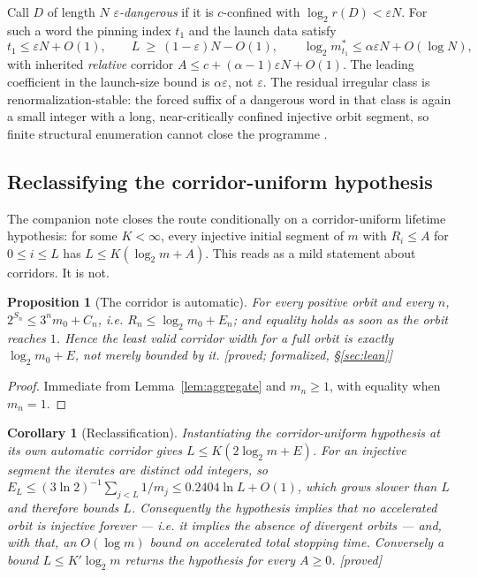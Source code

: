 \documentclass[11pt]{article}
\theoremstyle{plain}
\newtheorem{proposition}[theorem]{Proposition}
\newtheorem{corollary}[theorem]{Corollary}
\theoremstyle{definition}
\theoremstyle{remark}
\newcommand{\al}{\alpha}
\newcommand{\status}[1]{\textsf{\footnotesize[#1]}}
\begin{document}
Call $D$ of length $N$ \emph{$\varepsilon$-dangerous} if it is $c$-confined with
$\log_2 r(D)<\varepsilon N$. For such a word the pinning index $t_1$ and the launch data satisfy
\[
t_1\le\varepsilon N+O(1),\qquad
L\ \ge\ (1-\varepsilon)N-O(1),\qquad
\log_2 m^*_{t_1}\le \al\varepsilon N+O(\log N),
\]
with inherited \emph{relative} corridor $A\le c+(\al-1)\varepsilon N+O(1)$. The leading coefficient
in the launch-size bound is $\al\varepsilon$, not $\varepsilon$. The residual irregular class is
renormalization-stable: the forced suffix of a dangerous word in that class is again a small
integer with a long, near-critically confined injective orbit segment, so finite structural
enumeration cannot close the programme \cite{DJlaunch}.

\subsection{Reclassifying the corridor-uniform hypothesis}\label{sec:Uall}

The companion note closes the route conditionally on a corridor-uniform lifetime hypothesis: for
some $K<\infty$, every injective initial segment of $m$ with $R_i\le A$ for $0\le i\le L$ has
$L\le K(\log_2 m+A)$. This reads as a mild statement about corridors. It is not.

\begin{proposition}[The corridor is automatic]\label{prop:corridorauto}
For every positive orbit and every $n$, $2^{S_n}\le3^nm_0+C_n$, i.e.
$R_n\le\log_2 m_0+E_n$; and equality holds as soon as the orbit reaches $1$. Hence the least valid
corridor width for a full orbit is exactly $\log_2 m_0+E$, not merely bounded by it.
\status{proved; formalized, \S\ref{sec:lean}}
\end{proposition}

\begin{proof}
Immediate from Lemma~\ref{lem:aggregate} and $m_n\ge1$, with equality when $m_n=1$.
\end{proof}

\begin{corollary}[Reclassification]\label{cor:Uall}
Instantiating the corridor-uniform hypothesis at its own automatic corridor gives
$L\le K(2\log_2 m+E)$. For an injective segment the iterates are distinct odd integers, so
$E_L\le(3\ln2)^{-1}\sum_{j<L}1/m_j\le0.2404\ln L+O(1)$, which grows slower than $L$ and therefore
bounds $L$. Consequently the hypothesis implies that no accelerated orbit is injective forever ---
i.e. it implies the absence of divergent orbits --- and, with that, an $O(\log m)$ bound on
accelerated total stopping time. Conversely a bound $L\le K'\log_2 m$ returns the hypothesis for
every $A\ge0$. \status{proved}
\end{corollary}
\end{document}
